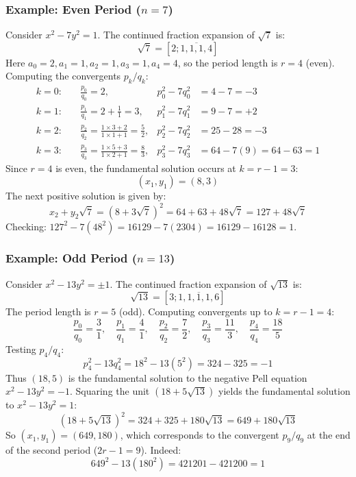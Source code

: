 \documentclass[a4paper]{article}
\begin{document}
\subsubsection{Example: Even Period (\texorpdfstring{$n = 7$}{n = 7})}
Consider $x^2 - 7y^2 = 1$.
The continued fraction expansion of $\sqrt{7}$ is:
\[
  \sqrt{7} = [2; \overline{1, 1, 1, 4}]
\]
Here $a_0 = 2, a_1 = 1, a_2 = 1, a_3 = 1, a_4 = 4$, so the period length is $r = 4$ (even).
Computing the convergents $p_k/q_k$:
\begin{align*}
  k = 0: \quad & \frac{p_0}{q_0} = 2, & p_0^2 - 7q_0^2 & = 4 - 7 = -3 \\
  k = 1: \quad & \frac{p_1}{q_1} = 2 + \frac{1}{1} = 3, & p_1^2 - 7q_1^2 & = 9 - 7 = +2 \\
  k = 2: \quad & \frac{p_2}{q_2} = \frac{1 \times 3 + 2}{1 \times 1 + 1} = \frac{5}{2}, & p_2^2 - 7q_2^2 & = 25 - 28 = -3 \\
  k = 3: \quad & \frac{p_3}{q_3} = \frac{1 \times 5 + 3}{1 \times 2 + 1} = \frac{8}{3}, & p_3^2 - 7q_3^2 & = 64 - 7(9) = 64 - 63 = 1
\end{align*}
Since $r = 4$ is even, the fundamental solution occurs at $k = r - 1 = 3$:
\[
  (x_1, y_1) = (8, 3)
\]
The next positive solution is given by:
\[
  x_2 + y_2\sqrt{7} = (8 + 3\sqrt{7})^2 = 64 + 63 + 48\sqrt{7} = 127 + 48\sqrt{7}
\]
Checking: $127^2 - 7(48^2) = 16129 - 7(2304) = 16129 - 16128 = 1$.

\subsubsection{Example: Odd Period (\texorpdfstring{$n = 13$}{n = 13})}
Consider $x^2 - 13y^2 = \pm 1$.
The continued fraction expansion of $\sqrt{13}$ is:
\[
  \sqrt{13} = [3; \overline{1, 1, 1, 1, 6}]
\]
The period length is $r = 5$ (odd).
Computing convergents up to $k = r - 1 = 4$:
\[
  \frac{p_0}{q_0} = \frac{3}{1}, \quad \frac{p_1}{q_1} = \frac{4}{1}, \quad \frac{p_2}{q_2} = \frac{7}{2}, \quad \frac{p_3}{q_3} = \frac{11}{3}, \quad \frac{p_4}{q_4} = \frac{18}{5}
\]
Testing $p_4/q_4$:
\[
  p_4^2 - 13q_4^2 = 18^2 - 13(5^2) = 324 - 325 = -1
\]
Thus $(18, 5)$ is the fundamental solution to the negative Pell equation $x^2 - 13y^2 = -1$.
Squaring the unit $(18 + 5\sqrt{13})$ yields the fundamental solution to $x^2 - 13y^2 = 1$:
\[
  (18 + 5\sqrt{13})^2 = 324 + 325 + 180\sqrt{13} = 649 + 180\sqrt{13}
\]
So $(x_1, y_1) = (649, 180)$, which corresponds to the convergent $p_9/q_9$ at the end of the second period ($2r - 1 = 9$).
Indeed:
\[
  649^2 - 13(180^2) = 421201 - 421200 = 1
\]
\end{document}
